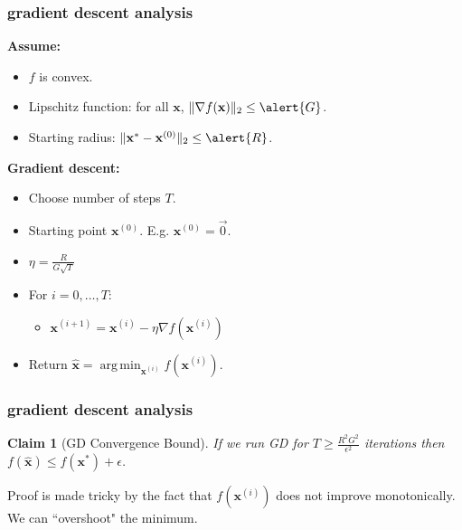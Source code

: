 \documentclass[compress]{beamer}
\newcommand{\bv}[1]{\mathbf{#1}}
\DeclareMathOperator*{\argmin}{arg\,min}
\newtheorem{claim}[theorem]{Claim}
\begin{document}
\begin{frame}[t]
	\frametitle{gradient descent analysis}
	\textbf{Assume:}
	\begin{itemize}
		\item $f$ is convex.
		\item Lipschitz function: for all $\bv{x}$, $\|\nabla f(\bv{x})\|_2 \leq \alert{G}$.
		\item Starting radius: $\|\bv{x}^{*} - \bv{x}^{(0)}\|_2 \leq \alert{R}$.
	\end{itemize}
	
	\textbf{Gradient descent:}
	\begin{itemize}
		\item Choose number of steps $T$.
		\item Starting point $\bv{x}^{(0)}$. E.g.  $\bv{x}^{(0)} = \vec{0}$.
		\item $\eta = \frac{R}{G\sqrt{T}}$
		\item For $i = 0,\ldots, T$:
		\begin{itemize}
			\item $\bv{x}^{(i+1)} = \bv{x}^{(i)} - \eta \nabla f(\bv{x}^{(i)})$
		\end{itemize}
		\item Return $\hat{\bv{x}} = \argmin_{\bv{x}^{(i)}} f(\bv{x}^{(i)})$.
	\end{itemize}
\end{frame}

\begin{frame}[t]
	\frametitle{gradient descent analysis}
	\begin{claim}[GD Convergence Bound]
		If we run GD for $T \geq \frac{R^2G^2}{\epsilon^2}$ iterations then $f(\hat{\bv{x}}) \leq f(\bv{x}^*) + \epsilon$.
	\end{claim}


	\vspace{12em}
	Proof is made tricky by the fact that $f(\bv{x}^{(i)})$ does not improve monotonically. We can ``overshoot" the minimum. 
\end{frame}
\end{document}
